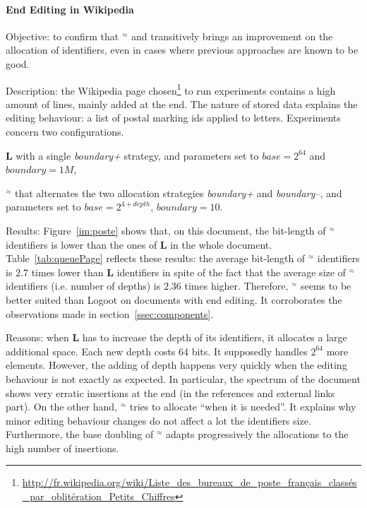 \paragraph{End Editing in Wikipedia}
\begin{asparadesc}
  
\item[Objective:] to confirm that \textbf{\NAME{}}$^\approx$ and transitively
  \NAME{} brings an improvement on the allocation of identifiers, even in cases
  where previous approaches are known to be good.

\item[Description:] the Wikipedia page
  chosen\footnote{\url{http://fr.wikipedia.org/wiki/Liste_des_bureaux_de_poste_français_classés_par_oblitération_Petits_Chiffres}}
  to run experiments contains a high amount of lines, mainly added at the
  end. The nature of stored data explains the editing behaviour: a list of
  postal marking ids applied to letters. Experiments concern two
  configurations.
  \begin{inparaenum}[(1)]
  \item \textbf{L} with a single \emph{boundary+} strategy, and parameters set
    to $base=2^{64}$ and $boundary=1M$,
  \item \textbf{\NAME{}}$^\approx$ that alternates the two allocation
    strategies \emph{boundary+} and \emph{boundary--}, and parameters set to
    $base=2^{4+depth}$, $boundary=10$.
  \end{inparaenum}

\item[Results:] Figure~\ref{im:poste} shows that, on this document, the
  bit-length of \textbf{\NAME{}}$^\approx$ identifiers is lower than the ones
  of \textbf{L} in the whole document. Table~\ref{tab:queuePage} reflects these
  results: the average bit-length of \textbf{\NAME{}}$^\approx$ identifiers is
  $2.7$ times lower than \textbf{L} identifiers in spite of the fact that the
  average size of \textbf{\NAME{}}$^\approx$ identifiers (i.e. number of
  depths) is $2.36$ times higher. Therefore, \textbf{\NAME{}}$^\approx$ seems
  to be better suited than Logoot on documents with end editing. It
  corroborates the observations made in section~\ref{ssec:components}.

\item[Reasons:] when \textbf{L} has to increase the depth of its identifiers,
  it allocates a large additional space. Each new depth costs 64 bits. It
  supposedly handles $2^64$ more elements. However, the adding of depth happens
  very quickly when the editing behaviour is not exactly as expected. In
  particular, the spectrum of the document shows very erratic insertions at the
  end (in the references and external links part). On the other hand,
  \textbf{\NAME{}}$^\approx$ tries to allocate ``when it is needed''. It
  explains why minor editing behaviour changes do not affect a lot the
  identifiers size. Furthermore, the base doubling of
  \textbf{\NAME{}}$^\approx$ adapts progressively the allocations to the high
  number of insertions.
\end{asparadesc}
 
